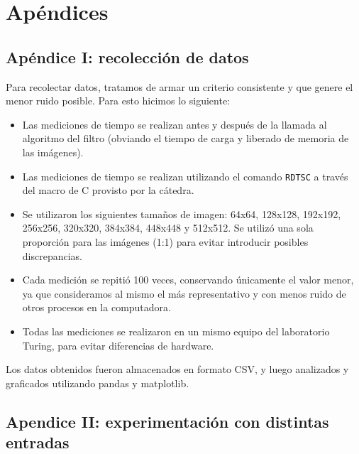 \section{Apéndices}
 	\subsection{Apéndice I: recolección de datos}

 	Para recolectar datos, tratamos de armar un criterio consistente y que genere el menor ruido posible. Para esto hicimos lo siguiente:

 	\begin{itemize}
 		\item Las mediciones de tiempo se realizan antes y después de la llamada al algoritmo del filtro (obviando el tiempo de carga y liberado de memoria de las imágenes).

 		\item Las mediciones de tiempo se realizan utilizando el comando \texttt{RDTSC} a través del macro de C provisto por la cátedra.

 		\item Se utilizaron los siguientes tamaños de imagen: 64x64, 128x128, 192x192, 256x256, 320x320, 384x384, 448x448 y 512x512. Se utilizó una sola proporción para las imágenes (1:1) para evitar introducir posibles discrepancias. 

 		\item Cada medición se repitió 100 veces, conservando únicamente el valor menor, ya que consideramos al mismo el más representativo y con menos ruido de otros procesos en la computadora.

 		\item Todas las mediciones se realizaron en un mismo equipo del laboratorio Turing, para evitar diferencias de hardware.
 	\end{itemize}

 	Los datos obtenidos fueron almacenados en formato CSV, y luego analizados y graficados utilizando pandas y matplotlib.

 	\subsection{Apendice II: experimentación con distintas entradas}

 	